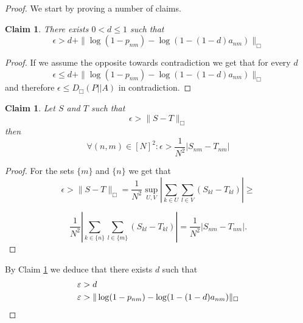 \documentclass[letterpaper]{article} %
\newtheorem{claim}[theorem]{Claim}
\begin{document}
\begin{proof}
We start by proving a number of claims.
    \begin{claim}
    There exists $0<d\leq 1$ such that \[\epsilon > d + \|\log(1-p_{nm}) - \log(1 - (1-d)a_{nm})\|_\Box\]
    \label{claim:d_exists}
    \end{claim}
    \begin{proof}
        If we assume the opposite towards contradiction we get that for every $d$
        \[\epsilon \leq d + \|\log(1-p_{nm}) - \log(1 - (1-d)a_{nm})\|_\Box\]
        and therefore $ \epsilon \leq D_\Box(P||A) $ in contradiction. 
    \end{proof}
    \begin{claim}
    \label{claim:elementwise_cut}
        Let $S$ and $T$ such that 
        \[\epsilon > \|S-T\|_\Box\]
        then 
        \[\forall (n,m) \in [N]^2: \epsilon > \frac{1}{N^2}|S_{nm} - T_{nm}|\]
    \end{claim}
    \begin{proof}
        For the sets $\{m\}$ and $\{n\}$ we get that
        \[\epsilon > \|S-T\|_\Box = \frac{1}{N^2}\underset{U,V}{\sup} |\sum\limits_{k \in U} \sum\limits_{l \in V} (S_{kl} - T_{kl})| \geq \]

        \[\frac{1}{N^2}|\sum\limits_{k \in \{n\}}\sum\limits_{l \in \{m\}} (S_{kl} - T_{kl})| =  \frac{1}{N^2}|S_{nm} - T_{nm}|.\] 
    \end{proof}
    By Claim \ref{claim:d_exists} we deduce that there exists $d$ such that 
    \begin{align}
    \label{eq:epsilon_d_epsilon_sup}
        \varepsilon &> d\notag \\
        \varepsilon &> \|\log(1-p_{nm}) - \log(1-(1-d)a_{nm})\|_\Box
    \end{align}
    

\end{proof}
\end{document}
